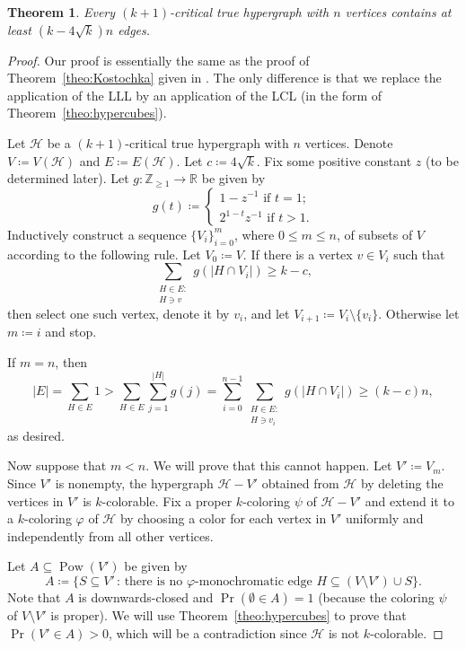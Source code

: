 \documentclass[10pt]{article}
\numberwithin{equation}{subsection}
\newtheorem{theo}{Theorem}[section]
\theoremstyle{definition}
\newcommand{\powerset}[1]{\operatorname{Pow}(#1)}
\begin{document}
	 \begin{theo}
	 	Every $(k+1)$-critical true hypergraph with $n$ vertices contains at least $(k-4\sqrt{k})n$ edges.
	 \end{theo}
	 \begin{proof}
	 	Our proof is essentially the same as the proof of Theorem~\ref{theo:Kostochka} given in \cite{Kostochka}. The only difference is that we replace the application of the LLL by an application of the LCL (in the form of Theorem~\ref{theo:hypercubes}).
	 	
		Let $\mathcal{H}$ be a $(k+1)$-critical true hypergraph with $n$ vertices. Denote $V \coloneqq V(\mathcal{H})$ and $E \coloneqq E(\mathcal{H})$. Let $c \coloneqq 4\sqrt{k}$. Fix some positive constant $z$ (to be determined later). Let $g \colon \mathbb{Z}_{\geq 1} \to \mathbb{R}$ be given by
		$$
			g(t) \coloneqq \begin{cases}
				1 - z^{-1} \text{ if } t = 1;\\
				2^{1-t}z^{-1} \text{ if } t > 1.	
			\end{cases}
		$$
		Inductively construct a sequence $\{V_i\}_{i = 0}^m$, where $0 \leq m \leq n$, of subsets of $V$ according to the following rule. Let $V_0 \coloneqq V$. If there is a vertex $v \in V_i$ such that
		\begin{equation}\label{eq:degree}
			\sum_{\substack{H \in E:\\ H \ni v}} g(|H \cap V_i|) \geq k - c,
		\end{equation}
		then select one such vertex, denote it by $v_i$, and let $V_{i+1} \coloneqq V_i \setminus \{v_i\}$. Otherwise let $m \coloneqq i$ and stop.

		If $m = n$, then
		$$
			|E| = \sum_{H \in E} 1 > \sum_{H \in E} \sum_{j = 1}^{|H|} g(j) = \sum_{i = 0}^{n-1} \sum_{\substack{H \in E:\\ H \ni v_i}} g(|H \cap V_i|) \geq (k-c) n,
		$$
		as desired.
		
		Now suppose that $m < n$. We will prove that this cannot happen. Let $V' \coloneqq V_m$. Since $V'$ is nonempty, the hypergraph $\mathcal{H} - V'$ obtained from $\mathcal{H}$ by deleting the vertices in $V'$ is $k$-colorable. Fix a proper $k$-coloring $\psi$ of $\mathcal{H}-V'$ and extend it to a $k$-coloring $\varphi$ of $\mathcal{H}$ by choosing a color for each vertex in $V'$ uniformly and independently from all other vertices.
		
		Let $A \subseteq \powerset{V'}$ be given by
		$$
			A \coloneqq \{ S \subseteq V' \,:\, \text{there is no $\varphi$-monochromatic edge $H \subseteq (V \setminus V') \cup S$}\}.
		$$
		Note that $A$ is downwards-closed and $\Pr(\emptyset \in A) = 1$ (because the coloring $\psi$ of $V \setminus V'$ is proper). We will use Theorem~\ref{theo:hypercubes} to prove that $\Pr(V' \in A) > 0$, which will be a contradiction since $\mathcal{H}$ is not $k$-colorable.
		

\end{proof}
\end{document}
